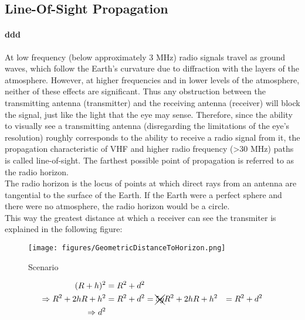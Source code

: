 \subsection*{Line-Of-Sight Propagation}
\paragraph{ddd}
At low frequency (below approximately 3 MHz) radio signals travel as ground waves, which follow the Earth's curvature due to diffraction with the layers of the atmosphere.
However, at higher frequencies and in lower levels of the atmosphere, neither of these effects are significant. Thus any obstruction between the transmitting antenna (transmitter) and the receiving antenna (receiver) will block the signal, just like the light that the eye may sense. Therefore, since the ability to visually see a transmitting antenna (disregarding the limitations of the eye's resolution) roughly corresponds to the ability to receive a radio signal from it, the propagation characteristic of VHF and higher radio frequency (>30 MHz) paths is called line-of-sight. The farthest possible point of propagation is referred to as the radio horizon.\\

The radio horizon is the locus of points at which direct rays from an antenna are tangential to the surface of the Earth. If the Earth were a perfect sphere and there were no atmosphere, the radio horizon would be a circle.\\

This way the greatest distance at which a receiver can see the transmiter is explained in the following figure:

\begin{figure}[h!]
  	\centering
 	\texttt{[image: figures/GeometricDistanceToHorizon.png]}
  	\caption[Pipeline survey]{Scenario}
\end{figure}

\begin{align}
(R+h)^2 &= R^2+d^2\\
\Rightarrow R^2+2hR+h^2 &= R^2+d^2 = \xcancel{5y} R^2+2hR+h^2 &= R^2+d^2\\
\Rightarrow d^2 
\end{align}